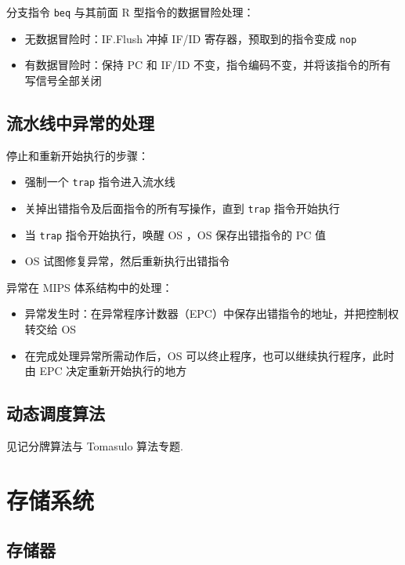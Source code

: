 \documentclass[cn, hazy, blue, normal, 12pt]{elegantnote}
\begin{document}
分支指令 \lstinline{beq} 与其前面 R 型指令的数据冒险处理：

\begin{itemize}
    \item 无数据冒险时：IF.Flush 冲掉 IF/ID 寄存器，预取到的指令变成 \lstinline{nop}
    \item 有数据冒险时：保持 PC 和 IF/ID 不变，指令编码不变，并将该指令的所有写信号全部关闭
\end{itemize}

\subsection{流水线中异常的处理}

停止和重新开始执行的步骤：

\begin{itemize}
    \item 强制一个 \lstinline{trap} 指令进入流水线
    \item 关掉出错指令及后面指令的所有写操作，直到 \lstinline{trap} 指令开始执行
    \item 当 \lstinline{trap} 指令开始执行，唤醒 OS ，OS 保存出错指令的 PC 值
    \item OS 试图修复异常，然后重新执行出错指令
\end{itemize}

异常在 MIPS 体系结构中的处理：

\begin{itemize}
    \item 异常发生时：在异常程序计数器（EPC）中保存出错指令的地址，并把控制权转交给 OS
    \item 在完成处理异常所需动作后，OS 可以终止程序，也可以继续执行程序，此时由 EPC 决定重新开始执行的地方
\end{itemize}

\subsection{动态调度算法}

见记分牌算法与 Tomasulo 算法专题.

\section{存储系统}

\subsection{存储器}
\end{document}
